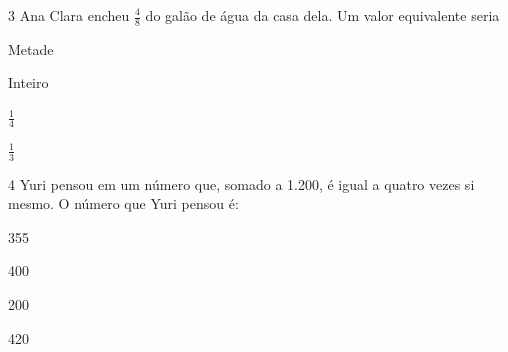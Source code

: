 \num{3} Ana Clara encheu $\frac{4}{8}$ do galão de água da casa dela. Um
valor equivalente seria

\begin{escolha}
\item Metade
\item Inteiro
\item $\frac{1}{4}$
\item $\frac{1}{3}$
\end{escolha}




\num{4} Yuri pensou em um número que, somado a 1.200, é igual a quatro vezes
si mesmo. O número que Yuri pensou é:

\begin{escolha}
\item 355
\item 400
\item 200
\item 420
\end{escolha}



